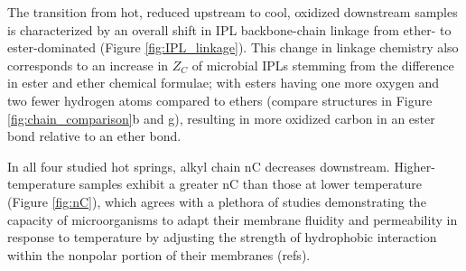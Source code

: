 The transition from hot, reduced upstream to cool, oxidized downstream samples is characterized by an overall shift in IPL backbone-chain linkage from ether- to ester-dominated (Figure \ref{fig:IPL_linkage}). This change in linkage chemistry also corresponds to an increase in $Z_{C}$ of microbial IPLs stemming from the difference in ester and ether chemical formulae; with esters having one more oxygen and two fewer hydrogen atoms compared to ethers (compare structures in Figure \ref{fig:chain_comparison}b and g), resulting in more oxidized carbon in an ester bond relative to an ether bond.




In all four studied hot springs, alkyl chain nC decreases downstream. Higher-temperature samples exhibit a greater nC than those at lower temperature (Figure \ref{fig:nC}), which agrees with a plethora of studies demonstrating the capacity of microorganisms to adapt their membrane fluidity and permeability in response to temperature by adjusting the strength of hydrophobic interaction within the nonpolar portion of their membranes (refs).



